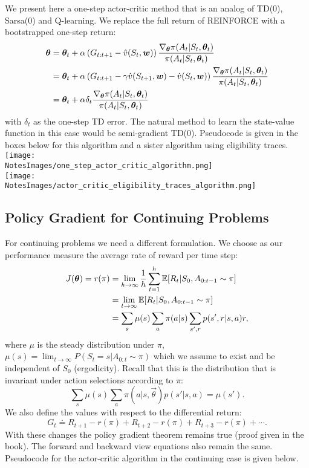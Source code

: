 We present here a one-step actor-critic method that is an analog of TD(0), Sarsa(0) and Q-learning. We replace the full return of REINFORCE with a bootstrapped one-step return:
\begin{align}
    \boldsymbol{\theta} &= \boldsymbol{\theta}_t + \alpha \left(  G_{t:t+1} - \hat{v}(S_t, \boldsymbol{w})\right) \frac{\nabla_{\boldsymbol{\theta}} \pi(A_t \vert{} S_t, \boldsymbol{\theta}_t)}{\pi(A_t \vert{} S_t, \boldsymbol{\theta}_t)}\\
    &= \boldsymbol{\theta}_t + \alpha \left(  G_{t:t+1} - \gamma\hat{v}(S_{t+1}, \boldsymbol{w}) - \hat{v}(S_{t}, \boldsymbol{w})\right) \frac{\nabla_{\boldsymbol{\theta}} \pi(A_t \vert{} S_t, \boldsymbol{\theta}_t)}{\pi(A_t \vert{} S_t, \boldsymbol{\theta}_t)}\\
    &= \boldsymbol{\theta}_t + \alpha \delta_t \frac{\nabla_{\boldsymbol{\theta}} \pi(A_t \vert{} S_t, \boldsymbol{\theta}_t)}{\pi(A_t \vert{} S_t, \boldsymbol{\theta}_t)}
\end{align}
with $\delta_t$ as the one-step TD error. The natural method to learn the state-value function in this case would be semi-gradient TD(0). Pseudocode is given in the boxes below for this algorithm and a sister algorithm using eligibility traces.\\

\texttt{[image: \\NotesImages/one\_step\_actor\_critic\_algorithm.png]}\\

\texttt{[image: \\NotesImages/actor\_critic\_eligibility\_traces\_algorithm.png]}\\


\subsection{Policy Gradient for Continuing Problems}
For continuing problems we need a different formulation. We choose as our performance measure the average rate of reward per time step:
\begin{align}
    J(\boldsymbol{\theta}) = r(\pi) &= \lim_{h \to \infty} \frac{1}{h} \sum_{t=1}^h \mathbb{E}{}[R_t \vert{} S_0, A_{0:t-1} \sim \pi] \\
    &= \lim_{t \to \infty} \mathbb{E}{}[R_t \vert{} S_0, A_{0:t-1} \sim \pi] \\
    &= \sum_s \mu(s) \sum_a \pi(a \vert{} s) \sum_{s', r} p(s', r \vert{} s, a)r,
\end{align}
where $\mu$ is the steady distribution under $\pi$, $\mu(s) = \lim_{t \to \infty} P{}(S_t = s \vert{} A_{0:t} \sim \pi)$ which we assume to exist and be independent of $S_0$ (ergodicity). Recall that this is the distribution that is invariant under action selections according to $\pi$:
\[
    \sum_s \mu(s) \sum_a \pi(a \vert{} s, \vec{\theta}) p(s' \vert{} s, a) = \mu(s').
\]
We also define the values with respect to the differential return:
\[
    G_t \doteq R_{t+1} - r(\pi) + R_{t+2} - r(\pi) + R_{t+3} - r(\pi) + \cdots.
\]
With these changes the policy gradient theorem remains true (proof given in the book). The forward and backward view equations also remain the same. Pseudocode for the actor-critic algorithm in the continuing case is given below.\\

